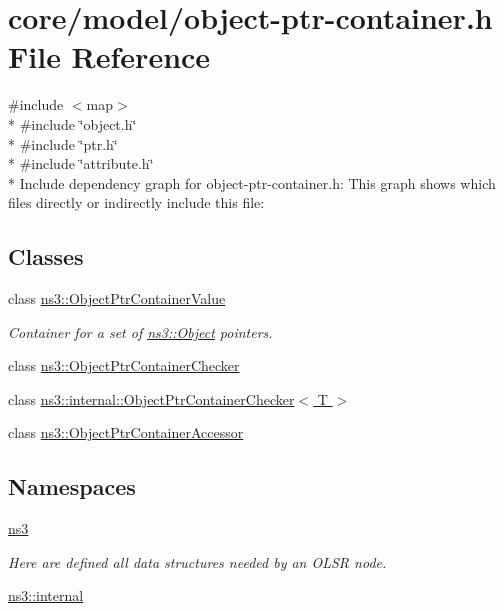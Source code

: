\hypertarget{object-ptr-container_8h}{}\section{core/model/object-\/ptr-\/container.h File Reference}
\label{object-ptr-container_8h}
{\ttfamily \#include $<$map$>$}\\*
{\ttfamily \#include \char`\"{}object.\+h\char`\"{}}\\*
{\ttfamily \#include \char`\"{}ptr.\+h\char`\"{}}\\*
{\ttfamily \#include \char`\"{}attribute.\+h\char`\"{}}\\*
Include dependency graph for object-\/ptr-\/container.h\+:
This graph shows which files directly or indirectly include this file\+:
\subsection*{Classes}
\begin{DoxyCompactItemize}
\item 
class \hyperlink{classns3_1_1ObjectPtrContainerValue}{ns3\+::\+Object\+Ptr\+Container\+Value}
\begin{DoxyCompactList}\small\item\em Container for a set of \hyperlink{classns3_1_1Object}{ns3\+::\+Object} pointers. \end{DoxyCompactList}\item 
class \hyperlink{classns3_1_1ObjectPtrContainerChecker}{ns3\+::\+Object\+Ptr\+Container\+Checker}
\item 
class \hyperlink{classns3_1_1internal_1_1ObjectPtrContainerChecker}{ns3\+::internal\+::\+Object\+Ptr\+Container\+Checker$<$ T $>$}
\item 
class \hyperlink{classns3_1_1ObjectPtrContainerAccessor}{ns3\+::\+Object\+Ptr\+Container\+Accessor}
\end{DoxyCompactItemize}
\subsection*{Namespaces}
\begin{DoxyCompactItemize}
\item 
 \hyperlink{namespacens3}{ns3}
\begin{DoxyCompactList}\small\item\em Here are defined all data structures needed by an O\+L\+SR node. \end{DoxyCompactList}\item 
 \hyperlink{namespacens3_1_1internal}{ns3\+::internal}
\end{DoxyCompactItemize}

